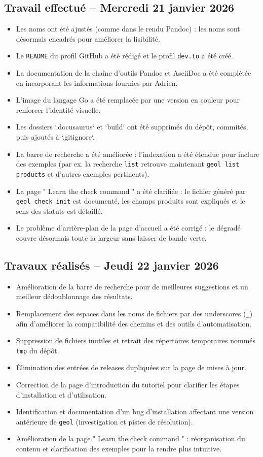 \documentclass[12pt,a4paper]{report}
\begin{document}
\subsection*{Travail effectué -- Mercredi 21 janvier 2026}
\begin{itemize}
  \item Les noms ont été ajustés (comme dans le rendu Pandoc) : les noms sont désormais encadrés pour améliorer la lisibilité.
  \item Le \verb|README| du profil GitHub a été rédigé et le profil \verb|dev.to| a été créé.
  \item La documentation de la chaîne d'outils Pandoc et AsciiDoc a été complétée en incorporant les informations fournies par Adrien.
  \item L'image du langage Go a été remplacée par une version en couleur pour renforcer l'identité visuelle.
  \item Les dossiers `.docusaurus` et `build` ont été supprimés du dépôt, commités, puis ajoutés à `.gitignore`.
  \item La barre de recherche a été améliorée : l'indexation a été étendue pour inclure des exemples (par ex. la recherche \verb|list| retrouve maintenant \verb|geol list products| et d'autres exemples pertinents).
  \item La page " Learn the check command " a été clarifiée : le fichier généré par \verb|geol check init| est documenté, les champs produits sont expliqués et le sens des statuts est détaillé.
  \item Le problème d'arrière‑plan de la page d'accueil a été corrigé : le dégradé couvre désormais toute la largeur sans laisser de bande verte.
\end{itemize}

\subsection*{Travaux réalisés -- Jeudi 22 janvier 2026}
\begin{itemize}
  \item Amélioration de la barre de recherche pour de meilleures suggestions et un meilleur dédoublonnage des résultats.
  \item Remplacement des espaces dans les noms de fichiers par des underscores (\verb|_|) afin d'améliorer la compatibilité des chemins et des outils d'automatisation.
  \item Suppression de fichiers inutiles et retrait des répertoires temporaires nommés \verb|tmp| du dépôt.
  \item Élimination des entrées de releases dupliquées sur la page de mises à jour.
  \item Correction de la page d'introduction du tutoriel pour clarifier les étapes d'installation et d'utilisation.
  \item Identification et documentation d'un bug d'installation affectant une version antérieure de \verb|geol| (investigation et pistes de résolution).
  \item Amélioration de la page " Learn the check command " : réorganisation du contenu et clarification des exemples pour la rendre plus intuitive.
\end{itemize}
\end{document}
